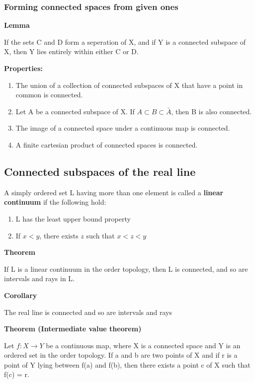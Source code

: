 \documentclass[11pt]{article}
\begin{document}
\subsubsection{Forming connected spaces from given ones}
\label{sec:org7c36aa5}

\textbf{Lemma}

If the sets C and D form a seperation of X, and if Y is a connected subspace of X, then Y lies entirely within either C or D.

\textbf{Properties:}
\begin{enumerate}
\item The union of a collection of connected subspaces of X that have a point in common is connected.
\item Let A be a connected subspace of X. If \(A \subset B \subset \bar{A}\), then B is also connected.
\item The image of a connected space under a continuous map is connected.
\item A finite cartesian product of connected spaces is connected.
\end{enumerate}


\subsection{Connected subspaces of the real line}
\label{sec:orgc19ee85}

A simply ordered set L having more than one element is called a \textbf{linear continuum} if the following hold:

\begin{enumerate}
\item L has the least upper bound property
\item If \(x < y\), there exists \(z\) such that \(x < z < y\)
\end{enumerate}

\textbf{Theorem}

If L is a linear continuum in the order topology, then L is connected, and so are intervals and rays in L.

\textbf{Corollary}

The real line is connected and so are intervals and rays

\textbf{Theorem (Intermediate value theorem)}

Let \(f : X \to Y\) be a continuous map, where X is a connected space and Y is an ordered set in the order topology. If a and b are two points of X and if r is a point of Y lying between f(a) and f(b), then there exists a point c of X such that f(c) = r.
\end{document}
